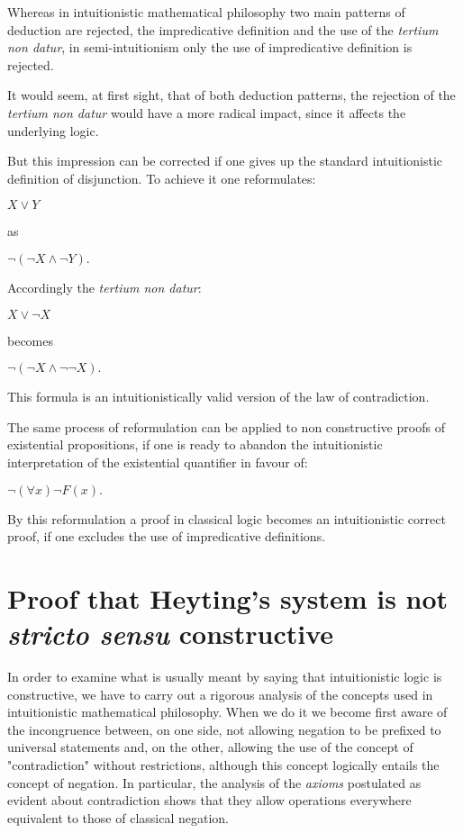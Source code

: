 \documentclass[12pt]{article}
\begin{document}
Whereas in intuitionistic mathematical philosophy two main patterns of deduction are rejected, the impredicative definition and the use of the \emph{tertium non datur}, in semi-intuitionism only the use of impredicative definition is rejected.

It would seem, at first sight, that of both deduction patterns, the rejection of the \emph{tertium non datur} would have a more radical impact, since it affects the underlying logic. 

But this impression can be corrected if one gives up the standard intuitionistic definition of disjunction. To achieve it one reformulates:

\begin{center} 
$X \vee Y$
\end{center} 

as

\begin{center}  
$\neg (\neg X \wedge \neg Y).$
\end{center}

Accordingly the \emph{tertium non datur}:

\begin{center} 
$X \vee \neg X$
\end{center}
 
becomes

\begin{center}
$\neg (\neg X \wedge \neg \neg X).$
\end{center}

This formula is an intuitionistically valid version of the law of contradiction.

The same process of reformulation can be applied to non constructive proofs of existential propositions, if one is ready to abandon the intuitionistic interpretation of the existential quantifier in favour of:

\begin{center} 
$\neg (\forall x) \neg F (x).$
\end{center}
 
By this reformulation a proof in classical logic becomes an intuitionistic correct proof, if one excludes the use of impredicative definitions.

\section{Proof that Heyting's system is not \emph{stricto sensu} constructive}\normalsize

In order to examine what is usually meant by saying that intuitionistic logic is constructive, we have to carry out a rigorous analysis of the concepts used in intuitionistic mathematical philosophy. When we do it we become first aware of the incongruence between, on one side, not allowing negation to be prefixed to universal statements and, on the other, allowing the use of the concept of "contradiction" without restrictions, although this concept logically entails the concept of negation. In particular, the analysis of the \emph{axioms} postulated as evident about contradiction shows that they allow operations everywhere equivalent to those of classical negation.
 
\end{document}

